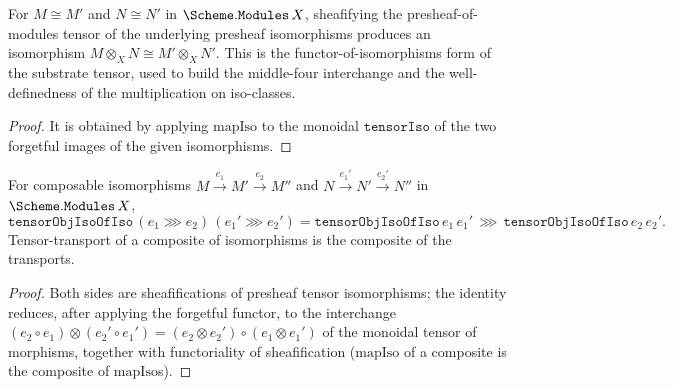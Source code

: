 \begin{definition}\label{mk-def:tensorobjisoofiso}
  \leanok

  For \(M \cong M'\) and \(N \cong N'\) in \(\Scheme.\mathtt{Modules}\,X\), sheafifying the
  presheaf-of-modules tensor of the underlying presheaf isomorphisms produces an
  isomorphism \(M \otimes_X N \cong M' \otimes_X N'\). This is the functor-of-isomorphisms
  form of the substrate tensor, used to build the middle-four interchange and the
  well-definedness of the multiplication on iso-classes.
\end{definition}
\begin{proof}
  \leanok
  It is obtained by applying \(\mathrm{mapIso}\) to the monoidal
  \(\mathtt{tensorIso}\) of the two forgetful images of the given isomorphisms.
\end{proof}
\begin{lemma}\label{mk-lem:tensorobjisoofiso_trans}
  \leanok

  For composable isomorphisms \(M \xrightarrow{e_1} M' \xrightarrow{e_2} M''\) and
  \(N \xrightarrow{e_1'} N' \xrightarrow{e_2'} N''\) in \(\Scheme.\mathtt{Modules}\,X\),
  \[
    \mathtt{tensorObjIsoOfIso}\,(e_1 \ggg e_2)\,(e_1' \ggg e_2')
      = \mathtt{tensorObjIsoOfIso}\,e_1\,e_1' \,\ggg\, \mathtt{tensorObjIsoOfIso}\,e_2\,e_2'.
  \]
  Tensor-transport of a composite of isomorphisms is the composite of the transports.
\end{lemma}
\begin{proof}
  \leanok
  Both sides are sheafifications of presheaf tensor isomorphisms; the identity reduces, after
  applying the forgetful functor, to the interchange
  \((e_2 \circ e_1) \otimes (e_2' \circ e_1') = (e_2 \otimes e_2') \circ (e_1 \otimes e_1')\)
  of the monoidal tensor of morphisms, together with functoriality of sheafification
  (\(\mathrm{mapIso}\) of a composite is the composite of \(\mathrm{mapIso}\)s).
\end{proof}

